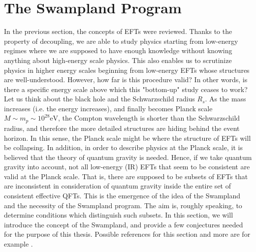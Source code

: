 \section{The Swampland Program}
In the previous section, the concepts of EFTs were reviewed. Thanks to the property of decoupling, we are able to study physics starting from low-energy regimes where we are supposed to have enough knowledge without knowing anything about high-energy scale physics. This also enables us to scrutinize physics in higher energy scales beginning from low-energy EFTs whose structures are well-understood. However, how far is this procedure valid? In other words, is there a specific energy scale above which this "bottom-up" study ceases to work? Let us think about the black hole and the Schwarzschild radius $R_{s}$. As the mass increases (i.e. the energy increases), and finally becomes Planck scale $M \sim m_{p} \sim 10^{28} \text{eV}$, the Compton wavelength is shorter than the Schwarzschild radius, and therefore the more detailed structures are hiding behind the event horizon. In this sense, the Planck scale might be where the structure of EFTs will be collapsing. In addition, in order to describe physics at the Planck scale, it is believed that the theory of quantum gravity is needed. Hence, if we take quantum gravity into account, not all low-energy (IR) EFTs that seem to be consistent are valid at the Planck scale. That is, there are supposed to be subsets of EFTs that are inconsistent in consideration of quantum gravity inside the entire set of consistent effective QFTs. This is the emergence of the idea of the Swampland and the necessity of the Swampland program. The aim is, roughly speaking, to determine conditions which distinguish such subsets. In this section, we will introduce the concept of the Swampland, and provide a few conjectures needed for the purpose of this thesis. Possible references for this section and more are for example \parencite{agmon_lectures_2022, grana_swampland_2021, vafa_string_2005}. 

